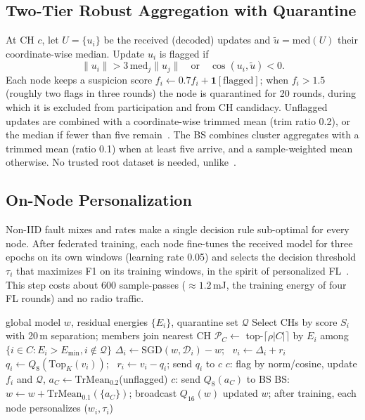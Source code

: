 \documentclass[journal]{IEEEtran}
\begin{document}
\subsection{Two-Tier Robust Aggregation with Quarantine}
At CH $c$, let $U=\{u_i\}$ be the received (decoded) updates and $\tilde u=\mathrm{med}(U)$ their coordinate-wise median. Update $u_i$ is flagged if
\begin{equation}
\|u_i\|>3\,\mathrm{med}_j\|u_j\|\quad\text{or}\quad\cos(u_i,\tilde u)<0 .
\end{equation}
Each node keeps a suspicion score $f_i\leftarrow0.7f_i+\mathbf{1}[\text{flagged}]$; when $f_i>1.5$ (roughly two flags in three rounds) the node is quarantined for 20 rounds, during which it is excluded from participation and from CH candidacy. Unflagged updates are combined with a coordinate-wise trimmed mean (trim ratio 0.2), or the median if fewer than five remain~\cite{yin2018}. The BS combines cluster aggregates with a trimmed mean (ratio 0.1) when at least five arrive, and a sample-weighted mean otherwise. No trusted root dataset is needed, unlike~\cite{cao2021}.

\subsection{On-Node Personalization}
Non-IID fault mixes and rates make a single decision rule sub-optimal for every node. After federated training, each node fine-tunes the received model for three epochs on its own windows (learning rate 0.05) and selects the decision threshold $\tau_i$ that maximizes F1 on its training windows, in the spirit of personalized FL~\cite{arivazhagan2019,tan2023}. This step costs about 600 sample-passes ($\approx1.2$\,mJ, the training energy of four FL rounds) and no radio traffic.

\begin{algorithm}[t]
\caption{One EASFL round}\label{alg:easfl}
\begin{algorithmic}[1]
\Require global model $w$, residual energies $\{E_i\}$, quarantine set $\mathcal{Q}$
\State Select CHs by score $S_i$ with 20\,m separation; members join nearest CH
 \State $\mathcal{P}_C\gets$ top-$\lceil\rho|C|\rceil$ by $E_i$ among $\{i\in C: E_i>E_{\min}, i\notin\mathcal{Q}\}$
  
   \State $\Delta_i\gets\mathrm{SGD}(w,\mathcal{D}_i)-w$; \ $v_i\gets\Delta_i+r_i$
   \State $q_i\gets Q_8(\mathrm{Top}_K(v_i))$; \ $r_i\gets v_i-q_i$; send $q_i$ to $c$
 \EndFor
 \State $c$: flag by norm/cosine, update $f_i$ and $\mathcal{Q}$, $a_C\gets\mathrm{TrMean}_{0.2}$(unflagged)
 \State $c$: send $Q_8(a_C)$ to BS
\EndFor
\State BS: $w\gets w+\mathrm{TrMean}_{0.1}(\{a_C\})$; broadcast $Q_{16}(w)$
\Ensure updated $w$; after training, each node personalizes ($w_i,\tau_i$)
\end{algorithmic}
\end{algorithm}
\end{document}
